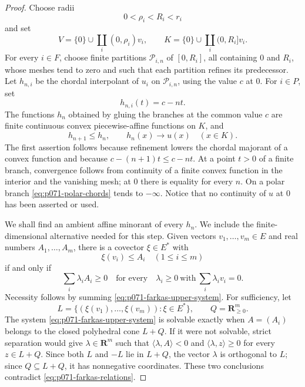 \begin{proof}
Choose radii
\[
                    0<\rho_i<R_i<r_i
\]
and set
\begin{equation}
\label{eq:p071-fixed-star-neighbourhoods}
 V=\{0\}\cup\coprod_i(0,\rho_i)v_i,
 \qquad
 K=\{0\}\cup\coprod_i(0,R_i]v_i.
\end{equation}
For every $i\in F$, choose finite partitions
$\mathcal P_{i,n}$ of $[0,R_i]$, all containing $0$ and $R_i$, whose
meshes tend to zero and such that each partition refines its predecessor.
Let $h_{n,i}$ be the chordal interpolant of $u_i$ on
$\mathcal P_{i,n}$, using the value $c$ at $0$.  For $i\in P$, set
\begin{equation}
\label{eq:p071-polar-chords}
                         h_{n,i}(t)=c-nt.
\end{equation}
The functions $h_n$ obtained by gluing the branches at the common value
$c$ are finite continuous convex piecewise-affine functions on $K$, and
\begin{equation}
\label{eq:p071-chord-monotonicity}
 h_{n+1}\leq h_n,
 \qquad
 h_n(x)\longrightarrow u(x)
 \quad(x\in K).
\end{equation}
The first assertion follows because refinement lowers the chordal
majorant of a convex function and because
$c-(n+1)t\leq c-nt$.  At a point $t>0$ of a finite branch, convergence
follows from continuity of a finite convex function in the interior and
the vanishing mesh; at $0$ there is equality for every $n$.  On a polar
branch \eqref{eq:p071-polar-chords} tends to $-\infty$.  Notice that no
continuity of $u$ at $0$ has been asserted or used.

We shall find an ambient affine minorant of every $h_n$.  We include the
finite-dimensional alternative needed for this step.  Given vectors
$v_1,\ldots,v_m\in E$ and real numbers $A_1,\ldots,A_m$, there is a covector
$\xi\in E^*$ with
\begin{equation}
\label{eq:p071-farkas-upper-system}
                           \xi(v_i)\leq A_i
                           \quad(1\leq i\leq m)
\end{equation}
if and only if
\begin{equation}
\label{eq:p071-farkas-relations}
 \sum_i\lambda_iA_i\geq0
 \quad\text{for every}\quad
 \lambda_i\geq0\ \text{with}\ \sum_i\lambda_i v_i=0.
\end{equation}
Necessity follows by summing \eqref{eq:p071-farkas-upper-system}.  For
sufficiency, let
\[
 L=\{(\xi(v_1),\ldots,\xi(v_m)):\xi\in E^*\},
 \qquad Q=\mathbf R_{\geq0}^m.
\]
The system \eqref{eq:p071-farkas-upper-system} is solvable exactly when
$A=(A_i)$ belongs to the closed polyhedral cone $L+Q$.  If it were not
solvable, strict separation would give $\lambda\in\mathbf R^m$ such that
$\langle\lambda,A\rangle<0$ and
$\langle\lambda,z\rangle\geq0$ for every $z\in L+Q$.  Since both $L$ and
$-L$ lie in $L+Q$, the vector $\lambda$ is orthogonal to $L$; since
$Q\subseteq L+Q$, it has nonnegative coordinates.  These two conclusions
contradict \eqref{eq:p071-farkas-relations}.


\end{proof}
